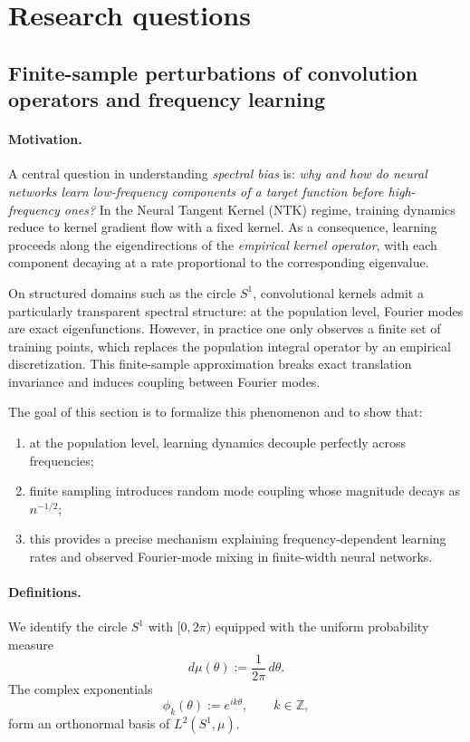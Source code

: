 \section{Research questions}\label{sec:rq}

\subsection{Finite-sample perturbations of convolution operators and frequency learning}

\paragraph{Motivation.}
A central question in understanding \emph{spectral bias} is:
\emph{why and how do neural networks learn low-frequency components of a target function before high-frequency ones?}
In the Neural Tangent Kernel (NTK) regime, training dynamics reduce to kernel gradient flow with a fixed kernel.
As a consequence, learning proceeds along the eigendirections of the \emph{empirical kernel operator}, with
each component decaying at a rate proportional to the corresponding eigenvalue.

On structured domains such as the circle \(S^1\), convolutional kernels admit a particularly transparent
spectral structure: at the population level, Fourier modes are exact eigenfunctions.
However, in practice one only observes a finite set of training points, which replaces the population
integral operator by an empirical discretization.
This finite-sample approximation breaks exact translation invariance and induces coupling between Fourier modes.

The goal of this section is to formalize this phenomenon and to show that:
\begin{enumerate}
	\item at the population level, learning dynamics decouple perfectly across frequencies;
	\item finite sampling introduces random mode coupling whose magnitude decays as \(n^{-1/2}\);
	\item this provides a precise mechanism explaining frequency-dependent learning rates and observed
	      Fourier-mode mixing in finite-width neural networks.
\end{enumerate}

\paragraph{Definitions.}
We identify the circle \(S^1\) with \([0,2\pi)\) equipped with the uniform probability measure
\[
	d\mu(\theta) := \frac{1}{2\pi}\, d\theta .
\]
The complex exponentials
\[
	\phi_k(\theta) := e^{ik\theta}, \qquad k \in \mathbb{Z},
\]
form an orthonormal basis of \(L^2(S^1,\mu)\).

